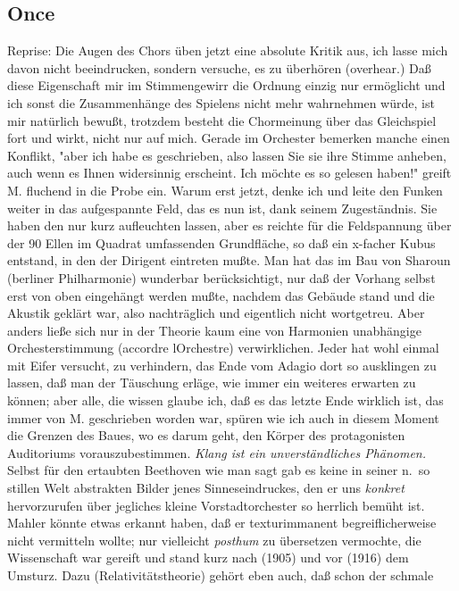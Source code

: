 \documentclass[
]{article}
\author{}
\date{\vspace{-2.5em}}
\begin{document}
\subsection{Once}\label{once}

Reprise: Die Augen des Chors üben jetzt eine absolute Kritik aus, ich
lasse mich davon nicht beeindrucken, sondern versuche, es zu überhören
(overhear.) Daß diese Eigenschaft mir im Stimmengewirr die Ordnung
einzig nur ermöglicht und ich sonst die Zusammenhänge des Spielens nicht
mehr wahrnehmen würde, ist mir natürlich bewußt, trotzdem besteht die
Chormeinung über das Gleichspiel fort und wirkt, nicht nur auf mich.
Gerade im Orchester bemerken manche einen Konflikt, "aber ich habe es
geschrieben, also lassen Sie sie ihre Stimme anheben, auch wenn es Ihnen
widersinnig erscheint. Ich möchte es so gelesen haben!" greift M.
fluchend in die Probe ein. Warum erst jetzt, denke ich und leite den
Funken weiter in das aufgespannte Feld, das es nun ist, dank seinem
Zugeständnis. Sie haben den nur kurz aufleuchten lassen, aber es reichte
für die Feldspannung über der 90 Ellen im Quadrat umfassenden
Grundfläche, so daß ein x-facher Kubus entstand, in den der Dirigent
eintreten mußte. Man hat das im Bau von Sharoun (berliner Philharmonie)
wunderbar berücksichtigt, nur daß der Vorhang selbst erst von oben
eingehängt werden mußte, nachdem das Gebäude stand und die Akustik
geklärt war, also nachträglich und eigentlich nicht wortgetreu. Aber
anders ließe sich nur in der Theorie kaum eine von Harmonien unabhängige
Orchesterstimmung (accordre l\textquotesingle Orchestre) verwirklichen.
Jeder hat wohl einmal mit Eifer versucht, zu verhindern, das Ende vom
Adagio dort so ausklingen zu lassen, daß man der Täuschung erläge, wie
immer ein weiteres erwarten zu können; aber alle, die wissen glaube ich,
daß es das letzte Ende wirklich ist, das immer von M. geschrieben worden
war, spüren wie ich auch in diesem Moment die Grenzen des Baues, wo es
darum geht, den Körper des protagonisten Auditoriums vorauszubestimmen.
\emph{Klang ist ein unverständliches Phänomen. }Selbst für den ertaubten
Beethoven wie man sagt gab es keine in seiner n.~so stillen Welt
abstrakten Bilder jenes Sinneseindruckes, den er uns \emph{konkret}
hervorzurufen über jegliches kleine Vorstadtorchester so herrlich bemüht
ist. Mahler könnte etwas erkannt haben, daß er texturimmanent
begreiflicherweise nicht vermitteln wollte; nur vielleicht
\emph{posthum} zu übersetzen vermochte, die Wissenschaft war gereift und
stand kurz nach (1905) und vor (1916) dem Umsturz. Dazu
(Relativitätstheorie) gehört eben auch, daß schon der schmale
\end{document}
